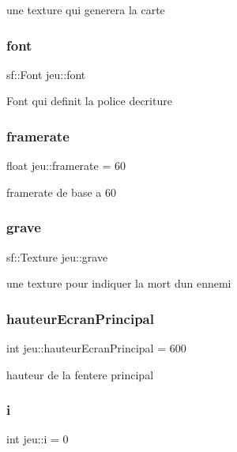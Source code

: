 une texture qui generera la carte \mbox{\label{classjeu_a685fe02c4c50c625c50732830a9a09f3}} 
\subsubsection{\texorpdfstring{font}{font}}
{\footnotesize\ttfamily sf\+::\+Font jeu\+::font}

Font qui definit la police d\textquotesingle{}ecriture \mbox{\label{classjeu_a6a6fdfc55acc0b08ea2c7f9874060f58}} 
\subsubsection{\texorpdfstring{framerate}{framerate}}
{\footnotesize\ttfamily float jeu\+::framerate = 60}

framerate de base a 60 \mbox{\label{classjeu_a93bcfdf5661eae0e78c7b098e921a5ce}} 
\subsubsection{\texorpdfstring{grave}{grave}}
{\footnotesize\ttfamily sf\+::\+Texture jeu\+::grave}

une texture pour indiquer la mort d\textquotesingle{}un ennemi \mbox{\label{classjeu_aab57f032f42308237e6bf9069f42870e}} 
\subsubsection{\texorpdfstring{hauteur\+Ecran\+Principal}{hauteurEcranPrincipal}}
{\footnotesize\ttfamily int jeu\+::hauteur\+Ecran\+Principal = 600}

hauteur de la fentere principal \mbox{\label{classjeu_a6ea074d22112a65a6da5b898cdc87ea2}} 
\subsubsection{\texorpdfstring{i}{i}}
{\footnotesize\ttfamily int jeu\+::i = 0}

